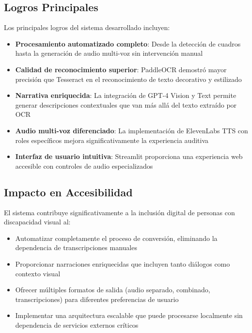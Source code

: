 \documentclass[conference]{IEEEtran}
\begin{document}
\subsection{Logros Principales}
Los principales logros del sistema desarrollado incluyen:
\begin{itemize}
\item \textbf{Procesamiento automatizado completo}: Desde la detección de cuadros hasta la generación de audio multi-voz sin intervención manual
\item \textbf{Calidad de reconocimiento superior}: PaddleOCR demostró mayor precisión que Tesseract en el reconocimiento de texto decorativo y estilizado
\item \textbf{Narrativa enriquecida}: La integración de GPT-4 Vision y Text permite generar descripciones contextuales que van más allá del texto extraído por OCR
\item \textbf{Audio multi-voz diferenciado}: La implementación de ElevenLabs TTS con roles específicos mejora significativamente la experiencia auditiva
\item \textbf{Interfaz de usuario intuitiva}: Streamlit proporciona una experiencia web accesible con controles de audio especializados
\end{itemize}

\subsection{Impacto en Accesibilidad}
El sistema contribuye significativamente a la inclusión digital de personas con discapacidad visual al:
\begin{itemize}
\item Automatizar completamente el proceso de conversión, eliminando la dependencia de transcripciones manuales
\item Proporcionar narraciones enriquecidas que incluyen tanto diálogos como contexto visual
\item Ofrecer múltiples formatos de salida (audio separado, combinado, transcripciones) para diferentes preferencias de usuario
\item Implementar una arquitectura escalable que puede procesarse localmente sin dependencia de servicios externos críticos
\end{itemize}
\end{document}
